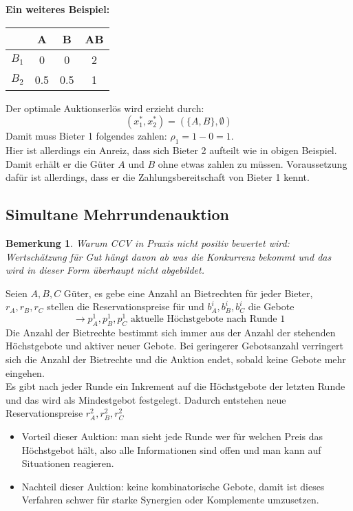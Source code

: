 \documentclass[12pt]{extreport} %
\theoremstyle{named}
\theoremstyle{itshape}
\theoremstyle{normal}
\newtheorem*{bemerkung}{Bemerkung}
\begin{document}
\textbf{Ein weiteres Beispiel:} ~\\

\begin{figure*}[h!] \centering
	\begin{tabular}{l|ccc}
		& A & B & AB \\
  			\hline
  		$B_1$ & 0 & 0 & 2  \\
  		$B_2$ & 0.5 & 0.5 & 1  \\
	\end{tabular}
\end{figure*}

Der optimale Auktionserlös wird erzieht durch:
$$ (x_1^*, x_2^*) = \left( \{ A, B \}, \emptyset \right) $$
Damit muss Bieter 1 folgendes zahlen: $\rho_1 = 1 - 0 = 1$. ~\\

Hier ist allerdings ein Anreiz, dass sich Bieter 2 aufteilt wie in obigen Beispiel. Damit erhält er die Güter $A$ und $B$ ohne etwas zahlen zu müssen. Voraussetzung dafür ist allerdings, dass er die Zahlungsbereitschaft von Bieter 1 kennt.


\subsection{Simultane Mehrrundenauktion}

\begin{bemerkung}
	Warum CCV in Praxis nicht positiv bewertet wird: Wertschätzung für Gut hängt davon ab was die Konkurrenz bekommt und das wird in dieser Form überhaupt nicht abgebildet.
\end{bemerkung}

Seien $A, B, C$ Güter, es gebe eine Anzahl an Bietrechten für jeder Bieter, $r_A, r_B, r_C$ stellen die Reservationspreise für und $b_A^i, b_B^i, b_C^i$ die Gebote 
$$ \rightarrow p_A^1, p_B^1, p_C^1 \text{ aktuelle Höchstgebote nach Runde 1} $$
Die Anzahl der Bietrechte bestimmt sich immer aus der Anzahl der stehenden Höchstgebote und aktiver neuer Gebote. Bei geringerer Gebotsanzahl verringert sich die Anzahl der Bietrechte und die Auktion endet, sobald keine Gebote mehr eingehen. ~\\

Es gibt nach jeder Runde ein Inkrement auf die Höchstgebote der letzten Runde und das wird als Mindestgebot festgelegt. Dadurch entstehen neue Reservationspreise  $r_A^2, r_B^2, r_C^2$

\begin{itemize}
	\item Vorteil dieser Auktion: man sieht jede Runde wer für welchen Preis das Höchstgebot hält, also alle Informationen sind offen und man kann auf Situationen reagieren.
	\item Nachteil dieser Auktion: keine kombinatorische Gebote, damit ist dieses Verfahren schwer für starke Synergien oder Komplemente umzusetzen.
\end{itemize}
\end{document}

